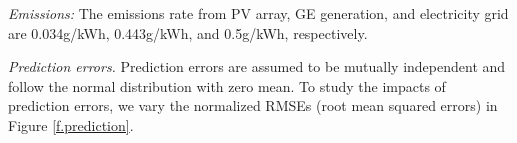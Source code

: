 \emph{Emissions:} The emissions rate from PV array, GE generation, and electricity grid are 0.034g/kWh, 0.443g/kWh, and 0.5g/kWh, respectively.

\emph{Prediction errors.} Prediction errors are assumed to be mutually independent and follow the normal distribution with zero mean. To study the impacts of prediction errors, we vary the normalized RMSEs (root mean squared errors) in Figure {\ref{f.prediction}}.






